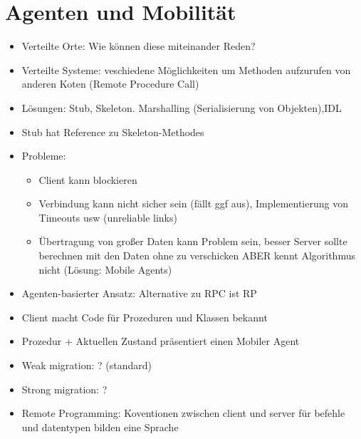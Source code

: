 \documentclass{article} %
\begin{document}
	\section{Agenten und Mobilität}
	\begin{itemize}
		\item Verteilte Orte: Wie können diese miteinander Reden?
		\item Verteilte Systeme: veschiedene Möglichkeiten um Methoden aufzurufen von anderen Koten (Remote Procedure Call)
		\item Lösungen: Stub, Skeleton. Marshalling (Serialisierung von Objekten),IDL
		\item Stub hat Reference zu Skeleton-Methodes
		\item Probleme: 
		\begin{itemize}
			\item Client kann blockieren
			\item Verbindung kann nicht sicher sein (fällt ggf aus), Implementierung von Timeouts usw (unreliable links)
			\item Übertragung von großer Daten kann Problem sein, besser Server sollte berechnen mit den Daten ohne zu verschicken ABER kennt Algorithmus nicht (Lösung: Mobile Agents)
		\end{itemize}
		\item Agenten-basierter Ansatz: Alternative zu RPC ist RP
		\item Client macht Code für Prozeduren und Klassen bekannt
		\item Prozedur + Aktuellen Zustand präsentiert einen Mobiler Agent
		\item Weak migration: ? (standard)
		\item Strong migration: ?
		\item Remote Programming: Koventionen zwischen client und server für befehle und datentypen bilden eine Sprache
	\end{itemize}
\end{document}
